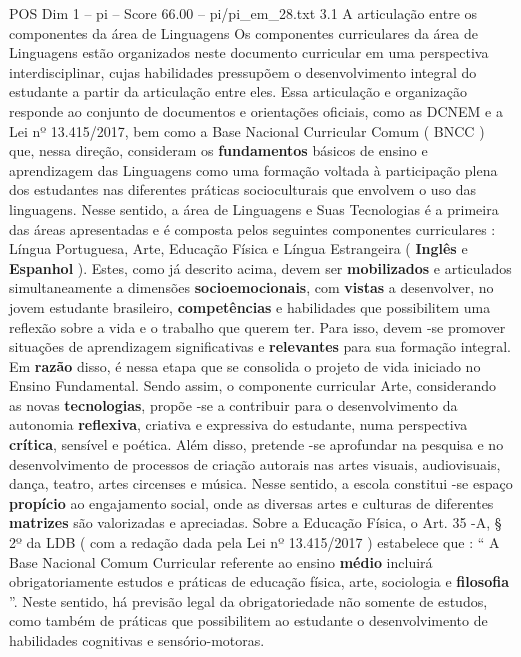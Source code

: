 \begin{textsample}{POS Dim 1 – pi – Score 66.00 – pi/pi\_em\_28.txt}  \label{ex:f1_pos_051}
3.1 A articulação entre os componentes da área de Linguagens Os componentes curriculares da área de Linguagens estão organizados neste documento curricular em uma perspectiva interdisciplinar, cujas habilidades pressupõem o desenvolvimento integral do estudante a partir da articulação entre eles.
Essa articulação e organização responde ao conjunto de documentos e orientações oficiais, como as DCNEM e a Lei nº 13.415/2017, bem como a Base Nacional Curricular Comum ( BNCC ) que, nessa direção, consideram os \textbf{fundamentos} básicos de ensino e aprendizagem das Linguagens como uma formação voltada à participação plena dos estudantes nas diferentes práticas socioculturais que envolvem o uso das linguagens.
Nesse sentido, a área de Linguagens e Suas Tecnologias é a primeira das áreas apresentadas e é composta pelos seguintes componentes curriculares : Língua Portuguesa, Arte, Educação Física e Língua Estrangeira ( \textbf{Inglês} e \textbf{Espanhol} ).
Estes, como já descrito acima, devem ser \textbf{mobilizados} e articulados simultaneamente a dimensões \textbf{socioemocionais}, com \textbf{vistas} a desenvolver, no jovem estudante brasileiro, \textbf{competências} e habilidades que possibilitem uma reflexão sobre a vida e o trabalho que querem ter.
Para isso, devem -se promover situações de aprendizagem significativas e \textbf{relevantes} para sua formação integral.
Em \textbf{razão} disso, é nessa etapa que se consolida o projeto de vida iniciado no Ensino Fundamental.
Sendo assim, o componente curricular Arte, considerando as novas \textbf{tecnologias}, propõe -se a contribuir para o desenvolvimento da autonomia \textbf{reflexiva}, criativa e expressiva do estudante, numa perspectiva \textbf{crítica}, sensível e poética.
Além disso, pretende -se aprofundar na pesquisa e no desenvolvimento de processos de criação autorais nas artes visuais, audiovisuais, dança, teatro, artes circenses e música.
Nesse sentido, a escola constitui -se espaço \textbf{propício} ao engajamento social, onde as diversas artes e culturas de diferentes \textbf{matrizes} são valorizadas e apreciadas.
Sobre a Educação Física, o Art. 35 -A, § 2º da LDB ( com a redação dada pela Lei nº 13.415/2017 ) estabelece que : “ A Base Nacional Comum Curricular referente ao ensino \textbf{médio} incluirá obrigatoriamente estudos e práticas de educação física, arte, sociologia e \textbf{filosofia} ”.
Neste sentido, há previsão legal da obrigatoriedade não somente de estudos, como também de práticas que possibilitem ao estudante o desenvolvimento de habilidades cognitivas e sensório-motoras.

\end{textsample}
